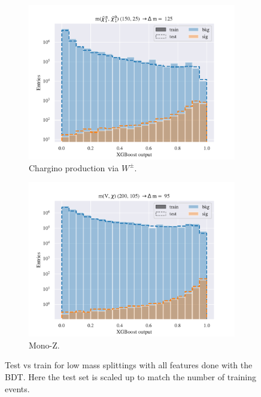 \begin{figure}[H]
    \begin{subfigure}[t!]{0.49\textwidth}
        \includegraphics[width = \textwidth]{Figures/WW/BDT/All_level/Low/scaled_train_test_395268.pdf}
        \caption{Chargino production via $W^\pm$.}
        \label{fig:WWLow}
    \end{subfigure}
    \begin{subfigure}[t!]{0.49\textwidth}
        \includegraphics[width = \textwidth]{Figures/Mono_Z/ML/BDT/All_level/Low/scaled_train_test_310604.pdf}
        \caption{Mono-Z.}
        \label{fig:MonoZLow}
    \end{subfigure}
    \caption{Test vs train for low mass splittings with all features done with the BDT. Here the test set is scaled up to match the number of training events.}
    \label{fig:AllLowBDT}
\end{figure}

